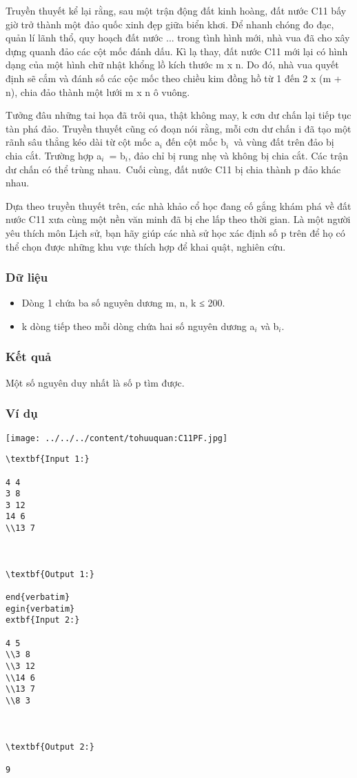 

Truyền thuyết kể lại rằng, sau một trận động đất kinh hoàng, đất nước C11 bấy giờ trở thành một đảo quốc xinh đẹp giữa biển khơi. Để nhanh chóng đo đạc, quản lí lãnh thổ, quy hoạch đất nước ... trong tình hình mới, nhà vua đã cho xây dựng quanh đảo các cột mốc đánh dấu. Kì lạ thay, đất nước C11 mới lại có hình dạng của một hình chữ nhật khổng lồ kích thước m x n. Do đó, nhà vua quyết định sẽ cắm và đánh số các cộc mốc theo chiều kim đồng hồ từ 1 đến 2 x (m + n), chia đảo thành một lưới m x n ô vuông.

Tưởng đâu những tai họa đã trôi qua, thật không may, k cơn dư chấn lại tiếp tục tàn phá đảo. Truyền thuyết cũng có đoạn nói rằng, mỗi cơn dư chấn i đã tạo một rãnh sâu thẳng kéo dài từ cột mốc a$_i$ đến cột mốc b$_i$ và vùng đất trên đảo bị chia cắt. Trường hợp a$_i$ = b$_i$, đảo chỉ bị rung nhẹ và không bị chia cắt. Các trận dư chấn có thể trùng nhau. Cuối cùng, đất nước C11 bị chia thành p đảo khác nhau.

Dựa theo truyền thuyết trên, các nhà khảo cổ học đang cố gắng khám phá về đất nước C11 xưa cùng một nền văn minh đã bị che lấp theo thời gian. Là một người yêu thích môn Lịch sử, bạn hãy giúp các nhà sử học xác định số p trên để họ có thể chọn được những khu vực thích hợp để khai quật, nghiên cứu.

\subsubsection{Dữ liệu}
\begin{itemize}
	\item Dòng 1 chứa ba số nguyên dương m, n, k ≤ 200.
	\item k dòng tiếp theo mỗi dòng chứa hai số nguyên dương a$_i$ và b$_i$.
\end{itemize}

\subsubsection{Kết quả}

Một số nguyên duy nhất là số p tìm được.

\subsubsection{Ví dụ}


\texttt{[image: ../../../content/tohuuquan:C11PF.jpg]}
\begin{verbatim}
\textbf{Input 1:}

4 4
3 8
3 12
14 6
\\13 7



\textbf{Output 1:}

end{verbatim}
egin{verbatim}
extbf{Input 2:}

4 5
\\3 8
\\3 12
\\14 6
\\13 7
\\8 3



\textbf{Output 2:}

9\end{verbatim}

